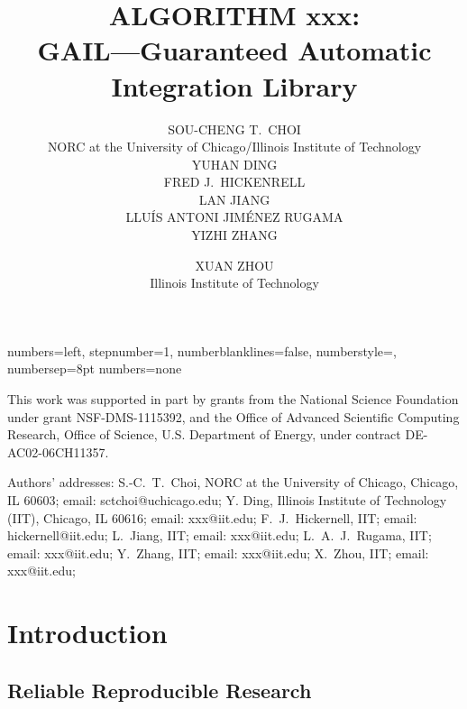 \documentclass[acmtoms]{doc_acmtrans2m}
\title{ALGORITHM xxx:
      \\GAIL---Guaranteed Automatic Integration Library}
\author{SOU-CHENG T.~CHOI
     \\NORC at the University of Chicago/Illinois Institute of Technology
     \\YUHAN DING
     \\FRED J.~HICKENRELL
     \\LAN JIANG
     \\LLU\'{I}S ANTONI JIM\'{E}NEZ RUGAMA
     \\YIZHI ZHANG
     \and XUAN ZHOU
     \\Illinois Institute of  Technology }
\begin{document}
{numbers=left, stepnumber=1, numberblanklines=false,
numberstyle=\tiny, numbersep=8pt}
{numbers=none}

\lstset{
language=[90]Fortran, %
basicstyle=\small,    %
style=numbers,        %
emptylines=*1,        %
breaklines=true,      %
escapeinside=<>,      %
framesep=2.5mm,       %
}


\begin{bottomstuff}
This work was supported in part by grants from
the National Science Foundation under grant NSF-DMS-1115392, and
the Office of Advanced Scientific Computing Research, Office of Science,
U.S. Department of Energy, under contract DE-AC02-06CH11357.

Authors' addresses:
%
   S.-C.~T.~Choi, NORC at the University of Chicago,
   Chicago, IL 60603; email: sctchoi@uchicago.edu;
%
   Y. Ding, Illinois Institute of Technology (IIT),
   Chicago, IL 60616; email: xxx@iit.edu;
%
   F.~J.~Hickernell, IIT; email: hickernell@iit.edu;
%
   L.~Jiang, IIT; email: xxx@iit.edu;
%
   L.~A.~J.~Rugama, IIT; email: xxx@iit.edu;
%
   Y.~Zhang, IIT; email: xxx@iit.edu;
%
   X.~Zhou, IIT; email: xxx@iit.edu;
\end{bottomstuff}

\maketitle



\section{Introduction} \label{sec:intro}


\subsection{Reliable Reproducible Research}
\end{document}
